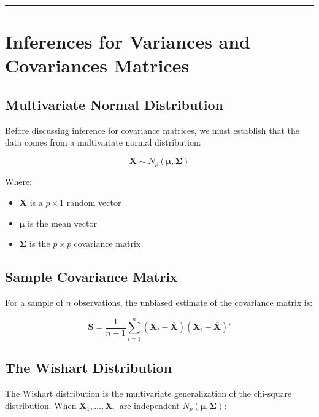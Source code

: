 \documentclass[
]{article}
\begin{document}
\begin{center}\rule{0.5\linewidth}{0.5pt}\end{center}

\textbf{ }

\section{Inferences for Variances and Covariances Matrices}

\textbf{ }

\subsection{Multivariate Normal Distribution}

Before discussing inference for covariance matrices, we must establish
that the data comes from a multivariate normal distribution:

\[\mathbf{X} \sim N_{p}\left( \mathbf{\mu},\mathbf{\Sigma} \right)\]

Where:

\begin{itemize}
\item
  \(\mathbf{X}\) is a \(p \times 1\) random vector
\item
  \(\mathbf{\mu}\) is the mean vector
\item
  \(\mathbf{\Sigma}\) is the \(p \times p\) covariance matrix
\end{itemize}

\textbf{ }

\subsection{Sample Covariance Matrix}

For a sample of \(n\) observations, the unbiased estimate of the
covariance matrix is:

\[\mathbf{S} = \frac{1}{n - 1}\sum_{i = 1}^{n}\left( \mathbf{X}_{i} - \overline{\mathbf{X}} \right)\left( \mathbf{X}_{i} - \overline{\mathbf{X}} \right)'\]

\textbf{ }

\subsection{The Wishart Distribution}

The Wishart distribution is the multivariate generalization of the
chi-square distribution. When \(\mathbf{X}_{1},\ldots,\mathbf{X}_{n}\)
are independent \(N_{p}\left( \mathbf{\mu},\mathbf{\Sigma} \right)\):
\end{document}
